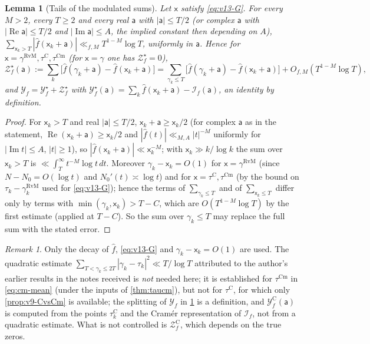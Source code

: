\documentclass[11pt,a4paper]{article}
\numberwithin{equation}{section}
\newtheorem{lemma}[theorem]{Lemma}
\theoremstyle{definition}
\theoremstyle{remark}
\newtheorem{remark}[theorem]{Remark}
\newcommand{\Cm}{\mathrm{Cm}}
\begin{document}
\begin{lemma}[Tails of the modulated sums]\label{lem:v15-tail}
Let $\mathsf x$ satisfy \eqref{eq:v13-G}. For every $M>2$, every $T\ge2$ and every real $\mathsf a$ with $|\mathsf a|\le T/2$ (or complex $\mathsf a$ with $|\operatorname{Re}\mathsf a|\le T/2$ and $|\operatorname{Im}\mathsf a|\le A$, the implied constant then depending on $A$), $\sum_{\mathsf x_k>T}|\hat f(\mathsf x_k+\mathsf a)|\ll_{f,M}T^{1-M}\log T$, uniformly in $\mathsf a$. Hence for $\mathsf x=\gamma^{\mathrm{RvM}},\tau^{\mathrm C},\tau^{\Cm}$ (for $\mathsf x=\gamma$ one has $\mathscr Z_f^\star=0$),
\begin{equation}
\mathscr Z_f^{\star}(\mathsf a):=\sum_k\bigl[\hat f(\gamma_k+\mathsf a)-\hat f(\mathsf x_k+\mathsf a)\bigr]=\sum_{\gamma_k\le T}\bigl[\hat f(\gamma_k+\mathsf a)-\hat f(\mathsf x_k+\mathsf a)\bigr]+O_{f,M}(T^{1-M}\log T),
\end{equation}
and $\mathscr Y_f=\mathscr Y_f^{\star}+\mathscr Z_f^{\star}$ with $\mathscr Y_f^{\star}(\mathsf a)=\sum_k\hat f(\mathsf x_k+\mathsf a)-\mathscr I_f(\mathsf a)$, an identity by definition.
\end{lemma}
\begin{proof}
For $\mathsf x_k>T$ and real $|\mathsf a|\le T/2$, $\mathsf x_k+\mathsf a\ge\mathsf x_k/2$ (for complex $\mathsf a$ as in the statement, $\operatorname{Re}(\mathsf x_k+\mathsf a)\ge\mathsf x_k/2$ and $|\hat f(t)|\ll_{M,A}|t|^{-M}$ uniformly for $|\operatorname{Im}t|\le A$, $|t|\ge1$), so $|\hat f(\mathsf x_k+\mathsf a)|\ll\mathsf x_k^{-M}$; with $\mathsf x_k\gg k/\log k$ the sum over $\mathsf x_k>T$ is $\ll\int_T^\infty t^{-M}\log t\,dt$. Moreover $\gamma_k-\mathsf x_k=O(1)$ for $\mathsf x=\gamma^{\mathrm{RvM}}$ (since $N-N_0=O(\log t)$ and $N_0'(t)\asymp\log t$) and for $\mathsf x=\tau^{\mathrm C},\tau^{\Cm}$ (by the bound on $\tau_k-\gamma_k^{\mathrm{RvM}}$ used for \eqref{eq:v13-G}); hence the terms of $\sum_{\gamma_k\le T}$ and of $\sum_{\mathsf x_k\le T}$ differ only by terms with $\min(\gamma_k,\mathsf x_k)>T-C$, which are $O(T^{1-M}\log T)$ by the first estimate (applied at $T-C$). So the sum over $\gamma_k\le T$ may replace the full sum with the stated error.
\end{proof}
\begin{remark}
Only the decay of $\hat f$, \eqref{eq:v13-G} and $\gamma_k-\mathsf x_k=O(1)$ are used. The quadratic estimate $\sum_{T<\gamma_k\le2T}|\gamma_k-\tau_k|^2\ll T/\log T$ attributed to the author's earlier results in the notes received is \emph{not} needed here; it is established for $\tau^{\Cm}$ in \eqref{eq:cm-mean} (under the inputs of \cref{thm:taucm}), but not for $\tau^{\mathrm C}$, for which only \cref{prop:v9-CvsCm} is available; the splitting of $\mathscr Y_f$ in \cref{lem:v15-tail} is a definition, and $\mathscr Y_f^{\mathrm C}(\mathsf a)$ is computed from the points $\tau_k^{\mathrm C}$ and the Cram\'er representation of $\mathscr I_f$, not from a quadratic estimate. What is not controlled is $\mathscr Z_f^{\mathrm C}$, which depends on the true zeros.
\end{remark}
\end{document}

